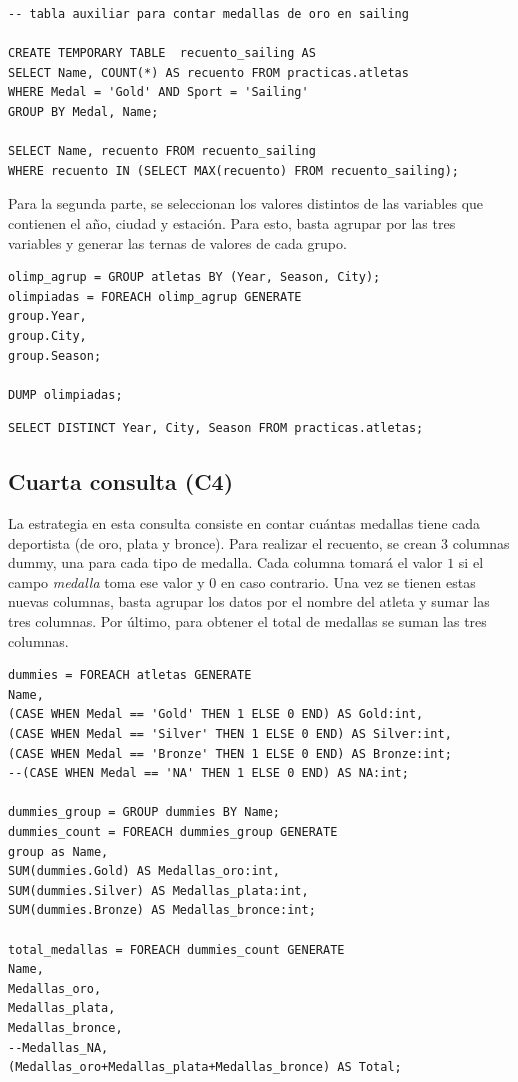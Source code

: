 \begin{lstlisting}[style=base,caption={C3 para el mejor atleta en Hive}, label={hive_C3}]	
-- tabla auxiliar para contar medallas de oro en sailing

CREATE TEMPORARY TABLE  recuento_sailing AS 
SELECT Name, COUNT(*) AS recuento FROM practicas.atletas 
WHERE Medal = 'Gold' AND Sport = 'Sailing' 
GROUP BY Medal, Name; 

SELECT Name, recuento FROM recuento_sailing 
WHERE recuento IN (SELECT MAX(recuento) FROM recuento_sailing);
\end{lstlisting}
Para la segunda parte, se seleccionan los valores distintos de las variables que contienen el año, ciudad y estación. Para esto, basta agrupar por las tres variables y generar las ternas de valores de cada grupo.
\begin{lstlisting}[style=base,caption={C3 para las olimpiadas por continente en Pig}, label={pig_C3_olimp}]	
olimp_agrup = GROUP atletas BY (Year, Season, City);
olimpiadas = FOREACH olimp_agrup GENERATE 
group.Year,
group.City,
group.Season;

DUMP olimpiadas;	
\end{lstlisting}

\begin{lstlisting}[style=base,caption={C3 para las olimpiadas por continente en Hive}, label={hive_C3_olimp}]	
SELECT DISTINCT Year, City, Season FROM practicas.atletas;
\end{lstlisting}
\subsection*{Cuarta consulta (C4)}
La estrategia en esta consulta consiste en contar cuántas medallas tiene cada deportista (de oro, plata y bronce). Para realizar el recuento, se crean 3 columnas dummy, una para cada tipo de medalla. Cada columna tomará el valor $1$ si el campo \textit{medalla} toma ese valor y 0 en caso contrario. Una vez se tienen estas nuevas columnas, basta agrupar los datos por el nombre del atleta y sumar las tres columnas. Por último, para obtener el total de medallas se suman las tres columnas.
\begin{lstlisting}[style=base,caption={C4, recuento de medallas en Pig}, label={pig_C4_med}]	
dummies = FOREACH atletas GENERATE 
Name,
(CASE WHEN Medal == 'Gold' THEN 1 ELSE 0 END) AS Gold:int,
(CASE WHEN Medal == 'Silver' THEN 1 ELSE 0 END) AS Silver:int,
(CASE WHEN Medal == 'Bronze' THEN 1 ELSE 0 END) AS Bronze:int;
--(CASE WHEN Medal == 'NA' THEN 1 ELSE 0 END) AS NA:int;

dummies_group = GROUP dummies BY Name;
dummies_count = FOREACH dummies_group GENERATE 
group as Name,
SUM(dummies.Gold) AS Medallas_oro:int,
SUM(dummies.Silver) AS Medallas_plata:int,
SUM(dummies.Bronze) AS Medallas_bronce:int;

total_medallas = FOREACH dummies_count GENERATE 
Name,
Medallas_oro,
Medallas_plata,
Medallas_bronce, 
--Medallas_NA,
(Medallas_oro+Medallas_plata+Medallas_bronce) AS Total;
\end{lstlisting}

